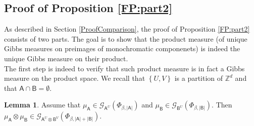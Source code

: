 \documentclass[12pt]{article}
\renewcommand{\AA}{\mathsf{A}}
\newcommand{\AB}{\mathsf{B}}
\newcommand{\G}{\mathcal{G}}
\newcommand{\Z}{\mathbb{Z}}
\newcommand{\set}[1]{\left\{#1\right\}}
\newcommand{\1}{\mathbbm{1}}
\newcommand{\5}{\vspace{0.5cm}}
\theoremstyle{definition}
\newtheorem{lem}[thm]{Lemma}
\begin{document}

\subsection{Proof of Proposition \ref{FP:part2}}

As described in Section \ref{ProofComparison}, the proof of Proposition \ref{FP:part2} consists of two parts. The goal is to show that the product measure (of unique Gibbs measures on preimages of monochromatic componenets) is indeed the unique Gibbs measure on their product. \\

The first step is indeed to verify that such product measure is in fact a Gibbs measure on the product space. We recall that $\set{U,V}$ is a partition of $\Z^d$ and that $\AA\cap\AB=\emptyset$. 

\begin{lem}
Assume that $\mu_\AA\in\G_{\AA^U}(\Phi_{\beta,|\AA|})$ and $\mu_\AB\in\G_{\AB^U}(\Phi_{\beta,|\AB|})$. Then $\mu_\AA\otimes\mu_\AB\in\G_{\AA^U\otimes\AB^V}(\Phi_{\beta,|\AA|+|\AB|})$.
\end{lem}
\end{document}
